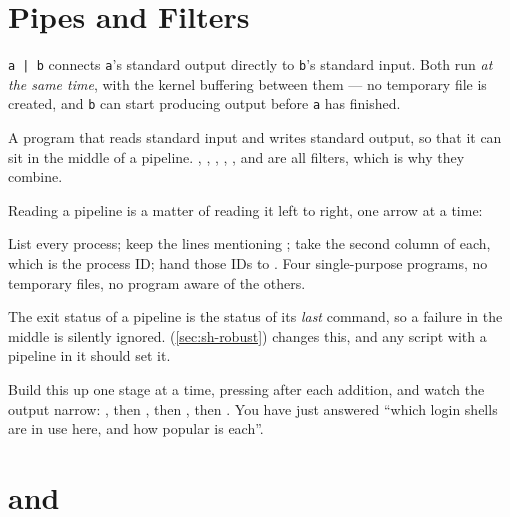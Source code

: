 \section{Pipes and Filters}\label{sec:sh-pipes}

\begin{definition}[Pipe]
	\texttt{a | b} connects \texttt{a}'s standard output directly to \texttt{b}'s
	standard input. Both run \emph{at the same time}, with the kernel buffering
	between them --- no temporary file is created, and \texttt{b} can start
	producing output before \texttt{a} has finished.
\end{definition}

\begin{definition}[Filter]
	A program that reads standard input and writes standard output, so that it can
	sit in the middle of a pipeline. , , , ,
	,  and  are all filters, which is why they combine.
\end{definition}

\begin{eg}
	Reading a pipeline is a matter of reading it left to right, one arrow at a
	time:
	List every process; keep the lines mentioning ; take the second
	column of each, which is the process ID; hand those IDs to . Four
	single-purpose programs, no temporary files, no program aware of the others.
\end{eg}

\begin{note}
	The exit status of a pipeline is the status of its \emph{last} command, so a
	failure in the middle is silently ignored. 
	(\autoref{sec:sh-robust}) changes this, and any script with a pipeline in it
	should set it.
\end{note}

\begin{tryit}
	Build this up one stage at a time, pressing  after each addition, and
	watch the output narrow:
	, then , then , then
	. You have just answered ``which login shells are in use here,
	and how popular is each''.
\end{tryit}

\section{\texorpdfstring{ and }{tee and xargs}}\label{sec:sh-teexargs}

